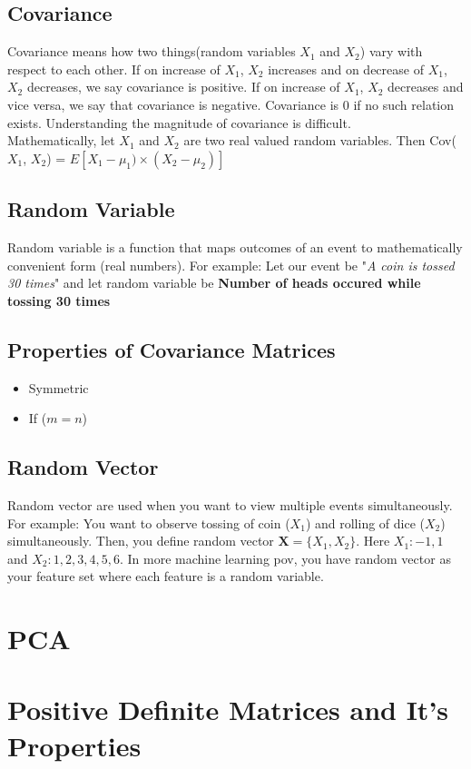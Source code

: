 \subsection{Covariance}
Covariance means how two things(random variables $X_1$ and $X_2$) vary with respect to each other. If on increase of $X_1$, $X_2$ increases and on decrease of $X_1$, $X_2$ decreases, we say covariance is positive. If on increase of $X_1$, $X_2$ decreases and vice versa, we say that covariance is negative. Covariance is 0 if no such relation exists. Understanding the magnitude of covariance is difficult. 
\\
Mathematically, let $X_1$ and $X_2$ are two real valued random variables. Then Cov($X_1$, $X_2$) = $E[X_1 - \mu_1)\times(X_2-\mu_2)]$
\subsection{Random Variable}
Random variable is a function that maps outcomes of an event to mathematically convenient form (real numbers). For example: Let our event be "\textit{A coin is tossed 30 times}" and let random variable be \textbf{Number of heads occured while tossing 30 times}

\subsection{Properties of Covariance Matrices}
\begin{itemize}
\item Symmetric
\item If ($m = n$)
\end{itemize}
\subsection{Random Vector}
Random vector are used when you want to view multiple events simultaneously. For example: You want to observe tossing of coin ($X_1$) and rolling of dice ($X_2$) simultaneously. Then, you define random vector $\textbf{X} = \{X_1, X_2\}$. Here $X_1: {-1,1}$ and $X_2: {1,2,3,4,5,6}$. In more machine learning pov, you have random vector as your feature set where each feature is a random variable.


\section{PCA}
\section{Positive Definite Matrices and It's Properties}
